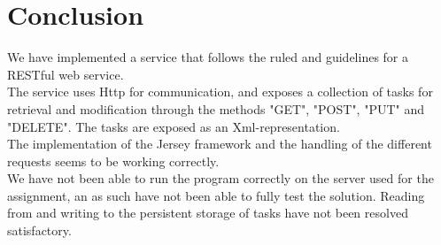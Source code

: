 \documentclass{report}
\begin{document}
	\section{Conclusion}
	\label{rest_conclusion}
	We have implemented a service that follows the ruled and guidelines for a RESTful web service.\\
	The service uses Http for communication, and exposes a collection of tasks for retrieval and modification through the methods "GET", "POST", "PUT" and "DELETE". The tasks are exposed as an Xml-representation.\\
	The implementation of the Jersey framework and the handling of the different requests seems to be working correctly.\\
	We have not been able to run the program correctly on the server used for the assignment, an as such have not been able to fully test the solution. Reading from and writing to the persistent storage of tasks have not been resolved satisfactory. 
\end{document}
